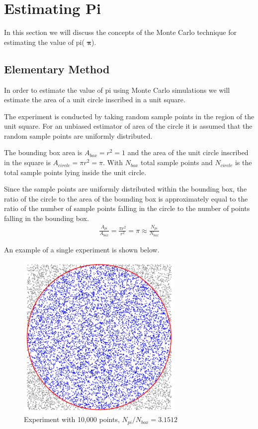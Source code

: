 \documentclass[12pt]{article}
\numberwithin{equation}{section}
\begin{document}
\section{Estimating Pi}
In this section we will discuss the concepts of  the  Monte  Carlo  technique  for  estimating  the  value  of  pi( $\mathbf{\pi}$).

\subsection{Elementary Method}
In order to estimate the value of pi using Monte Carlo simulations we will estimate the area of a unit circle inscribed in a unit square.
\par
The  experiment is  conducted by taking random sample points in the region of the unit square. For  an unbiased estimator of area of the circle it is assumed  that the  random sample  points are uniformly distributed.
\par
The bounding box area is  $A_{box}=r^2=1$ and the area of the unit circle inscribed in the square is $A_{circle}=\pi r^2=\pi$. With $N_{box}$ total sample points and $N_{circle}$ is the total sample points lying inside the unit circle.
\par
Since the sample points are uniformly distributed within the bounding box, the ratio of the circle to the area of the  bounding  box is  approximately  equal  to  the ratio  of the number  of  sample  points  falling  in  the circle to the number of points falling in the bounding box.
\begin{align}
   \frac{A_{pi}}{A_{box}}=\frac{\pi r^2}{r^2}=\pi\approx \frac{N_{pi}}{N_{box}} 
\end{align}
\par An example of a single experiment is shown below.
\begin{figure}[!htb]
    \centering
    \includegraphics[width=8cm]{Images/piexample.png}
    \caption{Experiment with 10,000 points, $N_{pi}/N_{box}=3.1512$}
    \label{fig:piexample}
\end{figure}\par
\end{document}
